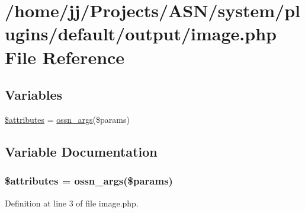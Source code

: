 \hypertarget{image_8php}{}\section{/home/jj/\+Projects/\+A\+S\+N/system/plugins/default/output/image.php File Reference}
\label{image_8php}
\subsection*{Variables}
\begin{DoxyCompactItemize}
\item 
\hyperlink{image_8php_adc851f7a62250e75df0490c0280aef4c}{\$attributes} = \hyperlink{ossn_8lib_8views_8php_a90922f09de8a06ea85351afb51fac9f7}{ossn\+\_\+args}(\$params)
\end{DoxyCompactItemize}


\subsection{Variable Documentation}
\subsubsection[{\texorpdfstring{\$attributes}{$attributes}}]{\setlength{\rightskip}{0pt plus 5cm}\$attributes = {\bf ossn\+\_\+args}(\$params)}\hypertarget{image_8php_adc851f7a62250e75df0490c0280aef4c}{}\label{image_8php_adc851f7a62250e75df0490c0280aef4c}


Definition at line 3 of file image.\+php.

